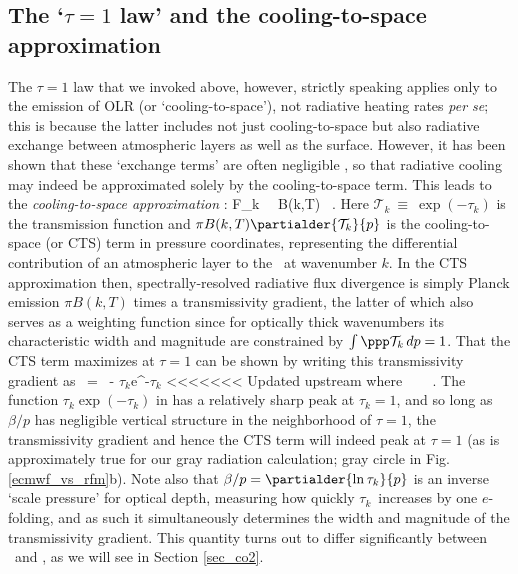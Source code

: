 \documentclass[10pt]{article}
\newcommand{\trans}{\ensuremath{\mathcal{T}}}
\newcommand{\tauk}{\ensuremath{\tau_k}}
\begin{document}
\subsection{The `$\tau=1$ law' and the cooling-to-space approximation} \label{sec_tau=1}
The $\tau=1$ law that we invoked above, however, strictly speaking applies only to the emission of OLR (or `cooling-to-space'), not radiative heating rates \emph{per se}; this is because  the latter includes not just cooling-to-space but also radiative exchange between atmospheric layers as well as the surface. However, it has been shown that these `exchange terms' are often negligible \citep{clough1992,rodgers1966}, so that radiative cooling may indeed be approximated solely by the cooling-to-space term. This leads to the  \emph{cooling-to-space approximation} \citep[e.g.][section 10.4]{petty2006}:  
\beqn
	\ppp F_k \ \approx \   \pi B(k,T) \partialder{\trans_k}{p} \  .
	\label{cts}
\eeqn
Here $\trans_k \ \equiv \ \exp(-\tauk)$ is the transmission function and $\pi B(k,T) \partialder{\trans_k}{p}$ is the cooling-to-space (or CTS) term in pressure coordinates, representing the differential contribution of an atmospheric layer to the \OLR\ at wavenumber $k$. In the CTS approximation then, spectrally-resolved radiative flux divergence is  simply Planck emission $\pi B(k,T)$ times a transmissivity gradient, the latter of which also serves as a weighting function since for optically thick wavenumbers its characteristic width and magnitude are constrained by $\int\ppp\trans_k \, dp = 1$. That the CTS term  maximizes at $\tau=1$ can be shown by  writing this transmissivity gradient as 
 \beqn
 		\partialder{\trans_k}{p} \  =  \ - \tauk e^{-\tauk} 
		 \label{trans_grad} 
\eeqn
<<<<<<< Updated upstream
where
\beqn
		\beta \  \equiv  \ \partialder{\ln \tauk}{\ln p} \ . 
		\label{beta_def}
\eeqn
 The function $\tauk \exp(-\tauk)$ in  has a relatively sharp peak at $\tauk=1$, and so long as $\beta/p$  has negligible vertical structure in the neighborhood of $\tau=1$, the transmissivity gradient and hence the CTS term will indeed peak at $\tau=1$ (as is approximately true for our gray radiation calculation; gray circle in Fig. \ref{ecmwf_vs_rfm}b). Note also that $\beta/p=\partialder{\ln\tauk}{p}$ is an inverse  `scale pressure' for optical depth, measuring how quickly \tauk\ increases by one $e$-folding, and as such  it simultaneously determines the width and magnitude of the transmissivity gradient. This quantity turns out to differ significantly between \htwo\ and \cotwo, as we will see in Section \ref{sec_co2}. 
 
\end{document}
